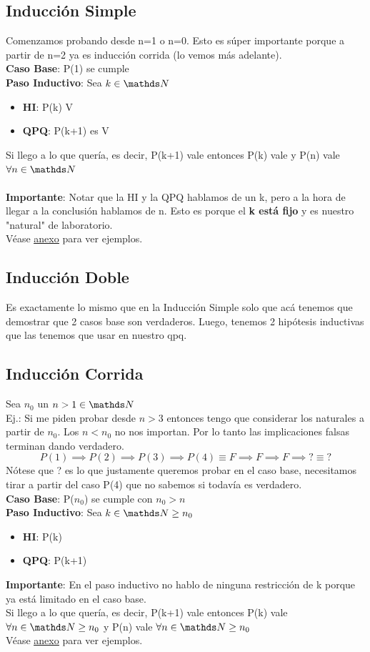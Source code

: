 \documentclass[10pt,a4paper]{article}
\begin{document}
\subsection*{Inducción Simple}
Comenzamos probando desde n=1 o n=0. Esto es súper importante porque a partir de n=2 ya es inducción corrida (lo vemos más adelante). \\
\textbf{Caso Base}: P(1) se cumple \\
\textbf{Paso Inductivo}: Sea $ k \in \nat$
\begin{itemize}
    \item \textbf{HI}: P(k) V
    \item \textbf{QPQ}: P(k+1) es V
\end{itemize}
Si llego a lo que quería, es decir, P(k+1) vale entonces P(k) vale y P(n) vale $\forall n \in \nat$ \\ \\
\textbf{Importante}: Notar que la HI y la QPQ hablamos de un k, pero a la hora de llegar a la conclusión hablamos de n. Esto es porque el \textbf{k está fijo} y es nuestro "natural" de laboratorio. \\
Véase \hyperref[subsec:induccion_simple]{\underline{anexo}} para ver ejemplos.
\subsection*{Inducción Doble}
Es exactamente lo mismo que en la Inducción Simple solo que acá tenemos que demostrar que 2 casos base son verdaderos. Luego, tenemos 2 hipótesis inductivas que las tenemos que usar en nuestro qpq.
\subsection*{Inducción Corrida}
Sea $n_{0}$ un $n>1 \in \nat$ \\
Ej.: Si me piden probar desde $n>3$ entonces tengo que considerar los naturales a partir de $n_{0}$. Los $n<n_{0}$ no nos importan. Por lo tanto las implicaciones falsas terminan dando verdadero. \\
\[P(1) \implies P(2) \implies P(3) \implies P(4) \equiv F \implies F \implies F \implies ? \equiv ? \]
Nótese que ? es lo que justamente queremos probar en el caso base, necesitamos tirar a partir del caso P(4) que no sabemos si todavía es verdadero. \\
\textbf{Caso Base}: P($n_{0}$) se cumple con $n_{0}>n$ \\
\textbf{Paso Inductivo}: Sea $ k \in \nat\ge n_{0} $
\begin{itemize}
    \item \textbf{HI}: P(k)
    \item \textbf{QPQ}: P(k+1)
\end{itemize}
\textbf{Importante}: En el paso inductivo no hablo de ninguna restricción de k porque ya está limitado en el caso base. \\
Si llego a lo que quería, es decir, P(k+1) vale entonces P(k) vale $\forall n \in \nat \ge n_{0}$ y P(n) vale $\forall n \in \nat \ge n_{0}$ \\
Véase \hyperref[subsec:induccion_corrida]{\underline{anexo}} para ver ejemplos.
\end{document}
